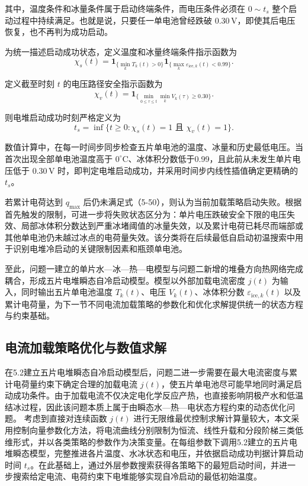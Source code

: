\documentclass[bwprint]{gmcmthesis}
\numberwithin{figure}{section}
\begin{document}
\noindent 其中，温度条件和冰量条件属于启动终端条件，而电压条件必须在 \(0 \sim t_s\) 整个启动过程中持续满足。也就是说，只要任一单电池曾经跌破 \(0.30 \, \text{V}\)，即使其后电压恢复，也不再判为成功启动。


\noindent 为统一描述启动成功状态，定义温度和冰量终端条件指示函数为
\begin{equation}
\chi_s(t) = \mathbf{1}_{\{\min\limits_k T_k(t) > 0\}} \mathbf{1}_{\{\max\limits_k \varepsilon_{\text{ice},k}(t) < 0.99\}}. \tag{5-48}
\end{equation}

\noindent 定义截至时刻 \(t\) 的电压路径安全指示函数为
\begin{equation}
\chi_v(t) = \mathbf{1}_{\{\min\limits_{0 \leq \tau \leq t} \min\limits_k V_k(\tau) \geq 0.30\}}. \tag{5-49}
\end{equation}

\noindent 则电堆启动成功时刻严格定义为
\begin{equation}
t_s = \inf \{t \geq 0 : \chi_s(t) = 1 \text{ 且 } \chi_v(t) = 1\}. \tag{5-50}
\end{equation}

\noindent 数值计算中，在每一时间步同步检查五片单电池的温度、冰量和历史最低电压。当首次出现全部单电池温度高于 \(0^\circ\text{C}\)、冰体积分数低于0.99，且此前从未发生单片电压低于 \(0.30 \, \text{V}\) 时，即判定电堆启动成功，并采用时间步内线性插值确定更精确的 \(t_s\)。

\noindent 若累计电荷达到 \(q_{\text{max}}\) 后仍未满足式（5-50），则认为当前加载策略启动失败。根据首先触发的限制，可进一步将失败状态区分为：单片电压跌破安全下限的电压失效、局部冰体积分数达到严重冰堵阈值的冰量失效，以及累计电荷已耗尽而端部或其他单电池仍未越过冰点的电荷量失效。该分类将在后续最低自启动初温搜索中用于识别电堆冷启动的关键限制因素和瓶颈单电池。

\noindent 至此，问题一建立的单片水—冰—热—电模型与问题二新增的堆叠方向热网络完成耦合，形成五片电堆瞬态自冷启动模型。模型以外部加载电流密度 \(j(t)\) 为输入，同时输出五片单电池温度 \(T_k(t)\)、电压 \(V_k(t)\)、冰体积分数 \(\varepsilon_{\text{ice},k}(t)\) 以及累计电荷量，为下一节不同电流加载策略的参数化和优化求解提供统一的状态方程与约束基础。

\subsection{电流加载策略优化与数值求解}

在5.2建立五片电堆瞬态自冷启动模型后，问题二进一步需要在最大电流密度与累计电荷量约束下确定合理的加载电流 \(j(t)\)，使五片单电池尽可能早地同时满足启动成功条件。由于加载电流不仅决定电化学反应产热，也直接影响阴极产水和低温结冰过程，因此该问题本质上属于由瞬态水—热—电状态方程约束的动态优化问题。
考虑到直接对连续函数 \(j(t)\) 进行无限维最优控制求解计算量较大，本文采用控制向量参数化方法，将电流曲线分别限制为恒流、线性升载和分段阶梯三类低维形式，并以各类策略的参数作为决策变量。在每组参数下调用5.2建立的五片电堆瞬态模型，完整推进各片温度、水冰状态和电压，并依据启动成功判据计算启动时间 \(t_s\)。在此基础上，通过外层参数搜索获得各策略下的最短启动时间，并进一步搜索给定电流、电荷约束下电堆能够实现自冷启动的最低初始温度。
\end{document}
